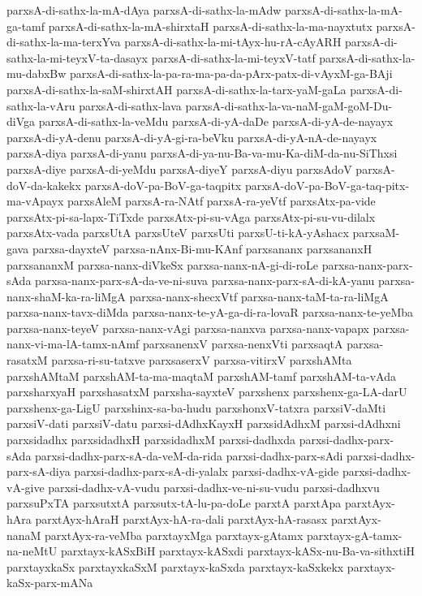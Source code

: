 {parxsA-di-sathx-la-mA-dAya
parxsA-di-sathx-la-mAdw
parxsA-di-sathx-la-mA-ga-tamf
parxsA-di-sathx-la-mA-shirxtaH
parxsA-di-sathx-la-ma-nayxtutx
parxsA-di-sathx-la-ma-terxYva
parxsA-di-sathx-la-mi-tAyx-hu-rA-cAyARH
parxsA-di-sathx-la-mi-teyxV-ta-dasayx
parxsA-di-sathx-la-mi-teyxV-tatf
parxsA-di-sathx-la-mu-dabxBw
parxsA-di-sathx-la-pa-ra-ma-pa-da-pArx-patx-di-vAyxM-ga-BAji
parxsA-di-sathx-la-saM-shirxtAH
parxsA-di-sathx-la-tarx-yaM-gaLa
parxsA-di-sathx-la-vAru
parxsA-di-sathx-lava
parxsA-di-sathx-la-va-naM-gaM-goM-Du-diVga
parxsA-di-sathx-la-veMdu
parxsA-di-yA-daDe
parxsA-di-yA-de-nayayx
parxsA-di-yA-denu
parxsA-di-yA-gi-ra-beVku
parxsA-di-yA-nA-de-nayayx
parxsA-diya
parxsA-di-yanu
parxsA-di-ya-nu-Ba-va-mu-Ka-diM-da-nu-SiThxsi
parxsA-diye
parxsA-di-yeMdu
parxsA-diyeY
parxsA-diyu
parxsAdoV
parxsA-doV-da-kakekx
parxsA-doV-pa-BoV-ga-taqpitx
parxsA-doV-pa-BoV-ga-taq-pitx-ma-vApayx
parxsAleM
parxsA-ra-NAtf
parxsA-ra-yeVtf
parxsAtx-pa-vide
parxsAtx-pi-sa-lapx-TiTxde
parxsAtx-pi-su-vAga
parxsAtx-pi-su-vu-dilalx
parxsAtx-vada
parxsUtA
parxsUteV
parxsUti
parxsU-ti-kA-yAshacx
parxsaM-gava
parxsa-dayxteV
parxsa-nAnx-Bi-mu-KAnf
parxsananx
parxsananxH
parxsananxM
parxsa-nanx-diVkeSx
parxsa-nanx-nA-gi-di-roLe
parxsa-nanx-parx-sAda
parxsa-nanx-parx-sA-da-ve-ni-suva
parxsa-nanx-parx-sA-di-kA-yanu
parxsa-nanx-shaM-ka-ra-liMgA
parxsa-nanx-shecxVtf
parxsa-nanx-taM-ta-ra-liMgA
parxsa-nanx-tavx-diMda
parxsa-nanx-te-yA-ga-di-ra-lovaR
parxsa-nanx-te-yeMba
parxsa-nanx-teyeV
parxsa-nanx-vAgi
parxsa-nanxva
parxsa-nanx-vapapx
parxsa-nanx-vi-ma-lA-tamx-nAmf
parxsanenxV
parxsa-nenxVti
parxsaqtA
parxsa-rasatxM
parxsa-ri-su-tatxve
parxsaserxV
parxsa-vitirxV
parxshAMta
parxshAMtaM
parxshAM-ta-ma-maqtaM
parxshAM-tamf
parxshAM-ta-vAda
parxsharxyaH
parxshasatxM
parxsha-sayxteV
parxshenx
parxshenx-ga-LA-darU
parxshenx-ga-LigU
parxshinx-sa-ba-hudu
parxshonxV-tatxra
parxsiV-daMti
parxsiV-dati
parxsiV-datu
parxsi-dAdhxKayxH
parxsidAdhxM
parxsi-dAdhxni
parxsidadhx
parxsidadhxH
parxsidadhxM
parxsi-dadhxda
parxsi-dadhx-parx-sAda
parxsi-dadhx-parx-sA-da-veM-da-rida
parxsi-dadhx-parx-sAdi
parxsi-dadhx-parx-sA-diya
parxsi-dadhx-parx-sA-di-yalalx
parxsi-dadhx-vA-gide
parxsi-dadhx-vA-give
parxsi-dadhx-vA-vudu
parxsi-dadhx-ve-ni-su-vudu
parxsi-dadhxvu
parxsuPxTA
parxsutxtA
parxsutx-tA-lu-pa-doLe
parxtA
parxtApa
parxtAyx-hAra
parxtAyx-hAraH
parxtAyx-hA-ra-dali
parxtAyx-hA-rasasx
parxtAyx-nanaM
parxtAyx-ra-veMba
parxtayxMga
parxtayx-gAtamx
parxtayx-gA-tamx-na-neMtU
parxtayx-kASxBiH
parxtayx-kASxdi
parxtayx-kASx-nu-Ba-va-sithxtiH
parxtayxkaSx
parxtayxkaSxM
parxtayx-kaSxda
parxtayx-kaSxkekx
parxtayx-kaSx-parx-mANa
}
